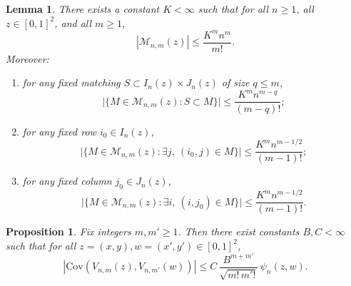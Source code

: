\documentclass[10pt,a4paper]{amsart}
\newtheorem{prop}{Proposition}
\newtheorem{lemma}{Lemma}
\newcommand{\cM}{\mathcal{M}}
\newcommand{\cov}{\mathrm{Cov}}
\begin{document}
\begin{lemma}\label{lem:matchingcount}
There exists a constant $K<\infty$ such that for all $n\ge1$, all $z\in[0,1]^2$,
and all $m\ge1$,
\[
|\cM_{n,m}(z)|\le \frac{K^m n^m}{m!}.
\]
Moreover:
\begin{enumerate}[label=\rm(\alph*), ref = \thelemma(\alph*), itemsep=0.2em]
\item \label{lem:matchingcount_a} for any fixed matching $S\subset I_n(z)\times J_n(z)$ of size $q\le m$,
\[
\bigl|\{M\in\cM_{n,m}(z): S\subset M\}\bigr|
\le \frac{K^m n^{m-q}}{(m-q)!};
\]

\item \label{lem:matchingcount_b} for any fixed row $i_0\in I_n(z)$,
\[
\bigl|\{M\in\cM_{n,m}(z): \exists j,\ (i_0,j)\in M\}\bigr|
\le \frac{K^m n^{m-1/2}}{(m-1)!};
\]
\item \label{lem:matchingcount_c} for any fixed column $j_0\in J_n(z)$,
\[
\bigl|\{M\in\cM_{n,m}(z): \exists i,\ (i,j_0)\in M\}\bigr|
\le \frac{K^m n^{m-1/2}}{(m-1)!}.
\]
\end{enumerate}
\end{lemma}

\begin{prop}
\label{prop:covariance-Vm}
Fix integers $m,m'\ge1$. Then there exist constants $B, C < \infty$ such that for all
$z=(x,y), w=(x',y')\in[0,1]^2$,
\begin{equation}
\left|
\cov\!\left(V_{n,m}(z),V_{n,m'}(w)\right)
\right|
\le
C\,\frac{B^{m+m'}}{\sqrt{m!\,m'!}}\,\psi_n(z,w).
\label{eq:14}
\end{equation}
\end{prop}
\end{document}
